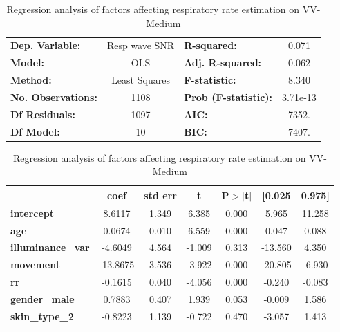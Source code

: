 \documentclass{article}
\begin{document}
\begin{table}[h!]
\begin{center}
\caption{Regression analysis of factors affecting respiratory rate estimation on VV-Medium}
\label{tab:vv-rr-regression-vv}
\begin{tabular}{lclc}
\toprule
\textbf{Dep. Variable:}          &  Resp wave SNR   & \textbf{  R-squared:         } &     0.071   \\
\textbf{Model:}                  &       OLS        & \textbf{  Adj. R-squared:    } &     0.062   \\
\textbf{Method:}                 &  Least Squares   & \textbf{  F-statistic:       } &     8.340   \\
\textbf{No. Observations:}       &        1108      & \textbf{  Prob (F-statistic):} &  3.71e-13   \\
\textbf{Df Residuals:}           &        1097      & \textbf{  AIC:               } &     7352.   \\
\textbf{Df Model:}               &          10      & \textbf{  BIC:               } &     7407.   \\
\bottomrule
\end{tabular}
\begin{tabular}{lcccccc}
                                 & \textbf{coef} & \textbf{std err} & \textbf{t} & \textbf{P$> |$t$|$} & \textbf{[0.025} & \textbf{0.975]}  \\
\midrule
\textbf{intercept}               &       8.6117  &        1.349     &     6.385  &         0.000        &        5.965    &       11.258     \\
\textbf{age}            			 &       0.0674  &        0.010     &     6.559  &         0.000        &        0.047    &        0.088     \\
\textbf{illuminance\_var} 		 &      -4.6049  &        4.564     &    -1.009  &         0.313        &      -13.560    &        4.350     \\
\textbf{movement}       			 &     -13.8675  &        3.536     &    -3.922  &         0.000        &      -20.805    &       -6.930     \\
\textbf{rr}          			 &      -0.1615  &        0.040     &    -4.056  &         0.000        &       -0.240    &       -0.083     \\
\textbf{gender\_male}   			 &       0.7883  &        0.407     &     1.939  &         0.053        &       -0.009    &        1.586     \\
\textbf{skin\_type\_2}  			 &      -0.8223  &        1.139     &    -0.722  &         0.470        &       -3.057    &        1.413     \\

\end{tabular}
\end{center}
\end{table}
\end{document}
